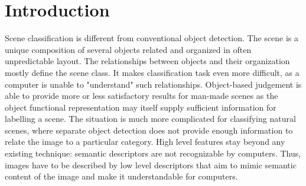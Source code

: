 \documentclass[%
	final,
	narroweqnarray,
	notitlepage,
	inline,
	twoside,
	]{ieee}
\begin{document}
\begin{abstract}
Scene categorization is a fundamental problem in image understanding. It is a challenging task in computer vision and widely applied in many fields, such as image retrieval, video surveillance, travel navigation or medical browser. Large image collections such as the Internet require efficient organization which is why a lot of attempts were performed to design automated systems to solve scene classification task in recent years.\\
The study presented in this paper aims to obtain high accuracy of scene classification through creating an advanced feature vector based on multiple feature sets extracted using Gabor filters, \textsc{CENTRIST} and color histograms. The goal is to produce feature vectors that describe the scene as accurately as possible. Each feature extraction method is first examined alone, then is combined with features obtained with other methods and tested on accuracy improvement. This paper shows the high performance obtained when combining these techniques. \\

\end{abstract}


    
\section{Introduction}
\label{sec:Introduction}

\PARstart  Scene classification is different from conventional object detection. The scene is a unique composition of several objects related and organized in often unpredictable layout. The relationships between objects and their organization mostly define the scene class. It makes classification task even more difficult, as a computer is unable to "understand" such relationships. Object-based judgement is able to provide more or less satisfactory results for man-made scenes as the object functional representation may itself supply sufficient information for labelling a scene. The situation is much more complicated for classifying natural scenes, where separate object detection does not provide enough information to relate the image to a particular category. High level features stay beyond any existing technique: semantic descriptors are not recognizable by computers. Thus, images have to be described by low level descriptors that aim to mimic semantic content of the image and make it understandable for computers.\\
\end{document}
